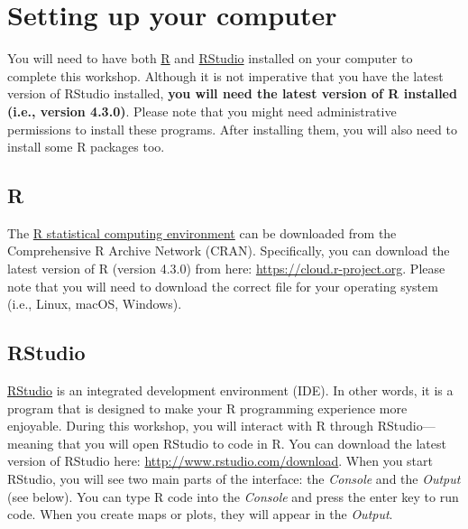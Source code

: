 \documentclass[
  12pt,
]{book}
\begin{document}
\hypertarget{setup}{%
\section{Setting up your computer}\label{setup}}

You will need to have both \href{https://www.r-project.org}{R} and \href{https://www.rstudio.com/}{RStudio} installed on your computer to complete this workshop. Although it is not imperative that you have the latest version of RStudio installed, \textbf{you will need the latest version of R installed (i.e., version 4.3.0)}. Please note that you might need administrative permissions to install these programs. After installing them, you will also need to install some R packages too.

\clearpage

\hypertarget{r}{%
\subsection{R}\label{r}}

The \href{https://www.r-project.org}{R statistical computing environment} can be downloaded from the Comprehensive R Archive Network (CRAN). Specifically, you can download the latest version of R (version 4.3.0) from here: \url{https://cloud.r-project.org}. Please note that you will need to download the correct file for your operating system (i.e., Linux, macOS, Windows).

\hypertarget{rstudio}{%
\subsection{RStudio}\label{rstudio}}

\href{https://www.rstudio.com}{RStudio} is an integrated development environment (IDE). In other words, it is a program that is designed to make your R programming experience more enjoyable. During this workshop, you will interact with R through RStudio---meaning that you will open RStudio to code in R. You can download the latest version of RStudio here: \url{http://www.rstudio.com/download}. When you start RStudio, you will see two main parts of the interface: the \emph{Console} and the \emph{Output} (see below). You can type R code into the \emph{Console} and press the enter key to run code. When you create maps or plots, they will appear in the \emph{Output}.
\end{document}
